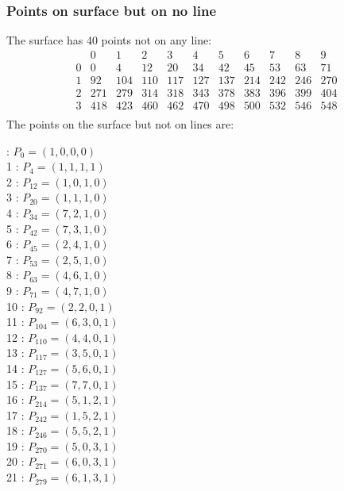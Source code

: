 \documentclass{article}
\begin{document}
{\subsubsection*{Points on surface but on no line}
The surface has 40 points not on any line:\\
$$
\begin{array}{r|*{10}{r}}
 & 0 & 1 & 2 & 3 & 4 & 5 & 6 & 7 & 8 & 9\\
\hline
0 & 0 & 4 & 12 & 20 & 34 & 42 & 45 & 53 & 63 & 71\\
1 & 92 & 104 & 110 & 117 & 127 & 137 & 214 & 242 & 246 & 270\\
2 & 271 & 279 & 314 & 318 & 343 & 378 & 383 & 396 & 399 & 404\\
3 & 418 & 423 & 460 & 462 & 470 & 498 & 500 & 532 & 546 & 548\\
\end{array}
$$
The points on the surface but not on lines are:\\
\begin{multicols}{2}
 : $P_{0}=( 1, 0, 0, 0 )$\\
1 : $P_{4}=( 1, 1, 1, 1 )$\\
2 : $P_{12}=( 1, 0, 1, 0 )$\\
3 : $P_{20}=( 1, 1, 1, 0 )$\\
4 : $P_{34}=( 7, 2, 1, 0 )$\\
5 : $P_{42}=( 7, 3, 1, 0 )$\\
6 : $P_{45}=( 2, 4, 1, 0 )$\\
7 : $P_{53}=( 2, 5, 1, 0 )$\\
8 : $P_{63}=( 4, 6, 1, 0 )$\\
9 : $P_{71}=( 4, 7, 1, 0 )$\\
10 : $P_{92}=( 2, 2, 0, 1 )$\\
11 : $P_{104}=( 6, 3, 0, 1 )$\\
12 : $P_{110}=( 4, 4, 0, 1 )$\\
13 : $P_{117}=( 3, 5, 0, 1 )$\\
14 : $P_{127}=( 5, 6, 0, 1 )$\\
15 : $P_{137}=( 7, 7, 0, 1 )$\\
16 : $P_{214}=( 5, 1, 2, 1 )$\\
17 : $P_{242}=( 1, 5, 2, 1 )$\\
18 : $P_{246}=( 5, 5, 2, 1 )$\\
19 : $P_{270}=( 5, 0, 3, 1 )$\\
20 : $P_{271}=( 6, 0, 3, 1 )$\\
21 : $P_{279}=( 6, 1, 3, 1 )$\\

\end{multicols}}
\end{document}
